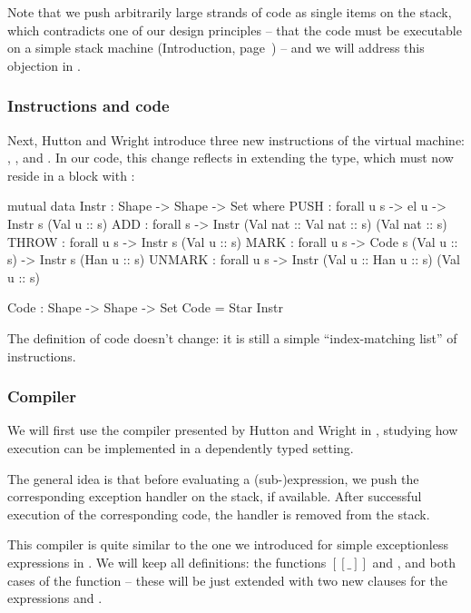 Note that we push arbitrarily large strands of code as single items on the stack,
which contradicts one of our design principles -- that the
code must be executable on a simple stack machine (Introduction, page~\pageref{objectives})
-- and we will address this objection in .

\subsubsection{Instructions and code}

Next, Hutton and Wright introduce three new instructions of the virtual machine:
, , and . In our code, this change
reflects in extending the  type, which must now reside in a
 block with :

\label{sec:gmh-ham-instr}\begin{code}
  mutual
    data Instr : Shape -> Shape -> Set where
      PUSH : forall {u s} -> el u -> Instr s (Val u :: s)
      ADD : forall s -> Instr (Val nat :: Val nat :: s) (Val nat :: s)
      THROW : forall {u s} -> Instr s (Val u :: s)
      MARK : forall {u s} -> Code s (Val u :: s) -> Instr s (Han u :: s)
      UNMARK : forall {u s} -> Instr (Val u :: Han u :: s) (Val u :: s)

    Code : Shape -> Shape -> Set
    Code = Star Instr
\end{code}

\noindent The definition of code doesn't change: it is still a simple
``index-matching list'' of instructions.

\subsubsection{Compiler}

We will first use the compiler presented by Hutton and Wright in
\cite{gmh:exceptions}, studying how execution can be implemented in a
dependently typed setting.

The general idea is that before evaluating a (sub-)expression, we push
the corresponding exception handler on the stack, if available. After
successful execution of the corresponding code, the handler is removed
from the stack.

This compiler is quite similar to the one we introduced for simple
exceptionless expressions in . We will keep all
definitions: the functions $[\!\![\_]\!\!]$ and , and both cases
of the function  -- these will be just extended with two new
clauses for the expressions  and .

